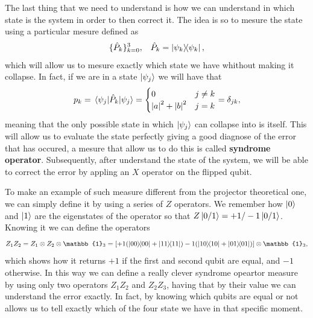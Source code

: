 The last thing that we need to understand is how we can understand in which state is the system in order to then correct it. The idea is so to mesure the state using a particular mesure defined as
\begin{align}
    &\{\hat{P}_k\}_{k=0}^3, &\hat{P}_k = \ketbra{\psi_k},
\end{align}
which will allow us to mesure exactly which state we have whithout making it collapse. In fact, if we are in a state $\ket{\psi_j}$ we will have that
\begin{equation}
    p_k = \ev{\hat{P}_k}{\psi_j} = \begin{cases}
        0 & j \neq k\\
        \abs{a}^2 + \abs{b}^2 & j = k
    \end{cases} = \delta_{jk},
\end{equation}
meaning that the only possible state in which $\ket{\psi_j}$ can collapse into is itself. This will allow us to evaluate the state perfectly giving a good diagnose of the error that has occured, a mesure that allow us to do this is called \textbf{syndrome operator}. Subsequently, after understand the state of the system, we will be able to correct the error by appling an $X$ operator on the flipped qubit.


To make an example of such measure different from the projector theoretical one, we can simply define it by using a series of $Z$ operators. We remember how $\ket{0}$ and $\ket{1}$ are the eigenstates of the operator so that $Z\ket{0/1} = +1/-1\ket{0/1}$. Knowing it we can define the operators
\begin{equation}
    Z_1Z_2 = Z_1\otimes Z_2\otimes \mathbb{1}_3 = [+1(\ketbra{00} + \ketbra{11}) -1(\ketbra{10} + \ketbra{01})]\otimes \mathbb{1}_3,
\end{equation}
which shows how it returns $+1$ if the first and second qubit are equal, and $-1$ otherwise. In this way we can define a really clever syndrome opeartor measure by using only two operators $Z_1Z_2$ and $Z_2Z_3$, having that by their value we can understand the error exactly. In fact, by knowing which qubits are equal or not allows us to tell exactly which of the four state we have in that specific moment.

